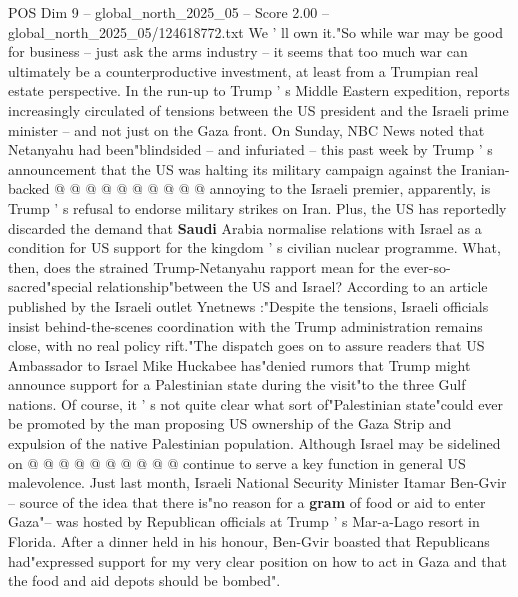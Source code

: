 \begin{textsample}{POS Dim 9 – global\_north\_2025\_05 – Score 2.00 – global\_north\_2025\_05/124618772.txt}
We ' ll own it."So while war may be good for business -- just ask the arms industry -- it seems that too much war can ultimately be a counterproductive investment, at least from a Trumpian real estate perspective.
In the run-up to Trump ' s Middle Eastern expedition, reports increasingly circulated of tensions between the US president and the Israeli prime minister -- and not just on the Gaza front.
On Sunday, NBC News noted that Netanyahu had been"blindsided -- and infuriated -- this past week by Trump ' s announcement that the US was halting its military campaign against the Iranian-backed @ @ @ @ @ @ @ @ @ @ annoying to the Israeli premier, apparently, is Trump ' s refusal to endorse military strikes on Iran.
Plus, the US has reportedly discarded the demand that \textbf{Saudi} Arabia normalise relations with Israel as a condition for US support for the kingdom ' s civilian nuclear programme.
What, then, does the strained Trump-Netanyahu rapport mean for the ever-so-sacred"special relationship"between the US and Israel?
According to an article published by the Israeli outlet Ynetnews :"Despite the tensions, Israeli officials insist behind-the-scenes coordination with the Trump administration remains close, with no real policy rift."The dispatch goes on to assure readers that US Ambassador to Israel Mike Huckabee has"denied rumors that Trump might announce support for a Palestinian state during the visit"to the three Gulf nations.
Of course, it ' s not quite clear what sort of"Palestinian state"could ever be promoted by the man proposing US ownership of the Gaza Strip and expulsion of the native Palestinian population.
Although Israel may be sidelined on @ @ @ @ @ @ @ @ @ @ continue to serve a key function in general US malevolence.
Just last month, Israeli National Security Minister Itamar Ben-Gvir -- source of the idea that there is"no reason for a \textbf{gram} of food or aid to enter Gaza"-- was hosted by Republican officials at Trump ' s Mar-a-Lago resort in Florida.
After a dinner held in his honour, Ben-Gvir boasted that Republicans had"expressed support for my very clear position on how to act in Gaza and that the food and aid depots should be bombed".

\end{textsample}
